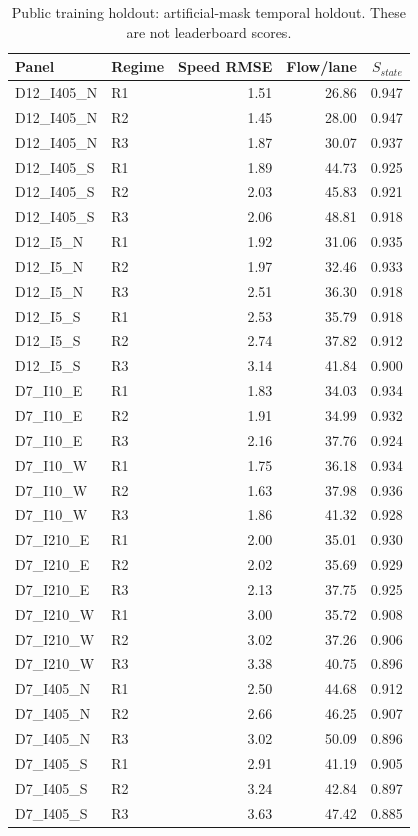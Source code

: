 \begin{table}[t]
\caption{Public training holdout: artificial-mask temporal holdout. These are not leaderboard scores.}
\centering\scriptsize
\begin{tabular}{llrrr}
\hline Panel & Regime & Speed RMSE & Flow/lane & $S_{state}$ \\
\hline
D12\_I405\_N & R1 & 1.51 & 26.86 & 0.947 \\
D12\_I405\_N & R2 & 1.45 & 28.00 & 0.947 \\
D12\_I405\_N & R3 & 1.87 & 30.07 & 0.937 \\
D12\_I405\_S & R1 & 1.89 & 44.73 & 0.925 \\
D12\_I405\_S & R2 & 2.03 & 45.83 & 0.921 \\
D12\_I405\_S & R3 & 2.06 & 48.81 & 0.918 \\
D12\_I5\_N & R1 & 1.92 & 31.06 & 0.935 \\
D12\_I5\_N & R2 & 1.97 & 32.46 & 0.933 \\
D12\_I5\_N & R3 & 2.51 & 36.30 & 0.918 \\
D12\_I5\_S & R1 & 2.53 & 35.79 & 0.918 \\
D12\_I5\_S & R2 & 2.74 & 37.82 & 0.912 \\
D12\_I5\_S & R3 & 3.14 & 41.84 & 0.900 \\
D7\_I10\_E & R1 & 1.83 & 34.03 & 0.934 \\
D7\_I10\_E & R2 & 1.91 & 34.99 & 0.932 \\
D7\_I10\_E & R3 & 2.16 & 37.76 & 0.924 \\
D7\_I10\_W & R1 & 1.75 & 36.18 & 0.934 \\
D7\_I10\_W & R2 & 1.63 & 37.98 & 0.936 \\
D7\_I10\_W & R3 & 1.86 & 41.32 & 0.928 \\
D7\_I210\_E & R1 & 2.00 & 35.01 & 0.930 \\
D7\_I210\_E & R2 & 2.02 & 35.69 & 0.929 \\
D7\_I210\_E & R3 & 2.13 & 37.75 & 0.925 \\
D7\_I210\_W & R1 & 3.00 & 35.72 & 0.908 \\
D7\_I210\_W & R2 & 3.02 & 37.26 & 0.906 \\
D7\_I210\_W & R3 & 3.38 & 40.75 & 0.896 \\
D7\_I405\_N & R1 & 2.50 & 44.68 & 0.912 \\
D7\_I405\_N & R2 & 2.66 & 46.25 & 0.907 \\
D7\_I405\_N & R3 & 3.02 & 50.09 & 0.896 \\
D7\_I405\_S & R1 & 2.91 & 41.19 & 0.905 \\
D7\_I405\_S & R2 & 3.24 & 42.84 & 0.897 \\
D7\_I405\_S & R3 & 3.63 & 47.42 & 0.885 \\
\hline
\end{tabular}
\end{table}